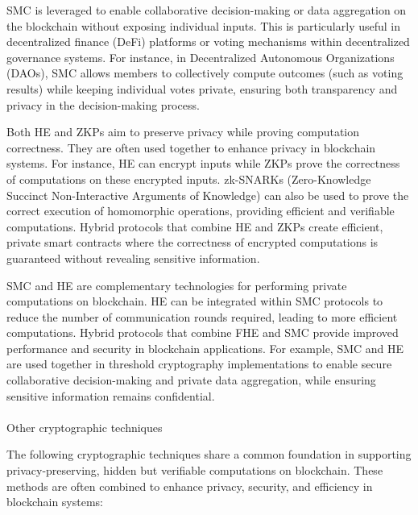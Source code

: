 \documentclass[
  letterpaper,
  DIV=11,
  numbers=noendperiod,
  oneside]{scrartcl}
\makeatletter
\let\oldparagraph\paragraph
\renewcommand{\paragraph}{
    \@ifstar
      \xxxParagraphStar
      \xxxParagraphNoStar
  }
\newcommand{\xxxParagraphStar}[1]{\oldparagraph*{#1}\mbox{}}
\newcommand{\xxxParagraphNoStar}[1]{\oldparagraph{#1}\mbox{}}
\makeatother
\begin{document}
SMC is leveraged to enable collaborative decision-making or data
aggregation on the blockchain without exposing individual inputs. This
is particularly useful in decentralized finance (DeFi) platforms or
voting mechanisms within decentralized governance systems. For instance,
in Decentralized Autonomous Organizations (DAOs), SMC allows members to
collectively compute outcomes (such as voting results) while keeping
individual votes private, ensuring both transparency and privacy in the
decision-making process.

Both HE and ZKPs aim to preserve privacy while proving computation
correctness. They are often used together to enhance privacy in
blockchain systems. For instance, HE can encrypt inputs while ZKPs prove
the correctness of computations on these encrypted inputs. zk-SNARKs
(Zero-Knowledge Succinct Non-Interactive Arguments of Knowledge) can
also be used to prove the correct execution of homomorphic operations,
providing efficient and verifiable computations. Hybrid protocols that
combine HE and ZKPs create efficient, private smart contracts where the
correctness of encrypted computations is guaranteed without revealing
sensitive information.

SMC and HE are complementary technologies for performing private
computations on blockchain. HE can be integrated within SMC protocols to
reduce the number of communication rounds required, leading to more
efficient computations. Hybrid protocols that combine FHE and SMC
provide improved performance and security in blockchain applications.
For example, SMC and HE are used together in threshold cryptography
implementations to enable secure collaborative decision-making and
private data aggregation, while ensuring sensitive information remains
confidential.

\paragraph{Other cryptographic
techniques}\label{other-cryptographic-techniques}

The following cryptographic techniques share a common foundation in
supporting privacy-preserving, hidden but verifiable computations on
blockchain. These methods are often combined to enhance privacy,
security, and efficiency in blockchain systems:
\end{document}
